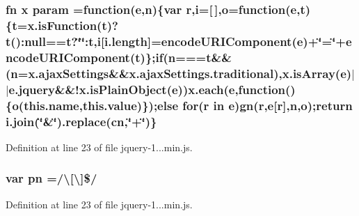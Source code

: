 \subsubsection[{\texorpdfstring{param}{param}}]{ {\bf fn} {\bf x} param =function({\bf e},{\bf n})\{var {\bf r},{\bf i}=\mbox{[}$\,$\mbox{]},{\bf o}=function({\bf e},{\bf t})\{{\bf t}=x.\+is\+Function({\bf t})?{\bf t}()\+:null=={\bf t}?\char`\"{}\char`\"{}\+:{\bf t},{\bf i}\mbox{[}i.\+length\mbox{]}=encode\+U\+R\+I\+Component({\bf e})+\char`\"{}=\char`\"{}+encode\+U\+R\+I\+Component({\bf t})\};{\bf if}({\bf n}==={\bf t}\&\&({\bf n}=x.\+ajax\+Settings\&\&x.\+ajax\+Settings.\+traditional),x.\+is\+Array({\bf e})$\vert$$\vert$e.\+jquery\&\&!x.\+is\+Plain\+Object({\bf e})){\bf x.\+each}({\bf e},function()\{{\bf o}(this.\+name,this.\+value)\});{\bf else} for({\bf r} in {\bf e}){\bf gn}({\bf r},{\bf e}\mbox{[}{\bf r}\mbox{]},{\bf n},{\bf o});return i.\+join(\char`\"{}\&\char`\"{}).replace({\bf cn},\char`\"{}+\char`\"{})\}}\hypertarget{obj_2_release_2_package_2_package_tmp_2_scripts_2jquery-1_810_82_8min_8js_ae8915303d11557d1b001bc56b6195251}{}\label{obj_2_release_2_package_2_package_tmp_2_scripts_2jquery-1_810_82_8min_8js_ae8915303d11557d1b001bc56b6195251}


Definition at line 23 of file jquery-\/1...\+min.\+js.

\subsubsection[{\texorpdfstring{pn}{pn}}]{\setlength{\rightskip}{0pt plus 5cm}var pn =/\textbackslash{}\mbox{[}\textbackslash{}\mbox{]}\$/}\hypertarget{obj_2_release_2_package_2_package_tmp_2_scripts_2jquery-1_810_82_8min_8js_a6a40831f7c967a457dbbd3b5e6f287d7}{}\label{obj_2_release_2_package_2_package_tmp_2_scripts_2jquery-1_810_82_8min_8js_a6a40831f7c967a457dbbd3b5e6f287d7}


Definition at line 23 of file jquery-\/1...\+min.\+js.

